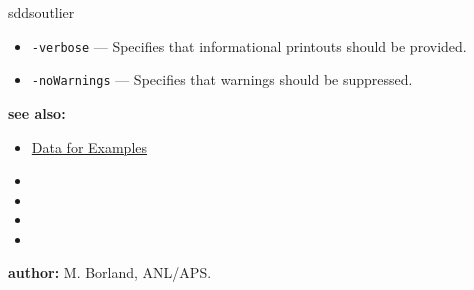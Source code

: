 \begin{sddsprog}{sddsoutlier}
\begin{itemize}
      \item \verb|-verbose| --- Specifies that informational printouts should be provided.
      \item \verb|-noWarnings| --- Specifies that warnings should be suppressed.
    \end{itemize}
  \item \textbf{see also:}
    \begin{itemize}
      \item \hyperref[exampleData]{Data for Examples}
      \item {}
      \item {}
      \item {}
      \item {}
    \end{itemize}
  \item \textbf{author:} M. Borland, ANL/APS.
\end{sddsprog}
